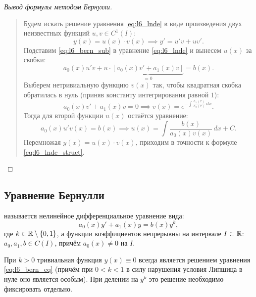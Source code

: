\begin{proof}[Вывод формулы методом Бернулли]~\\
    \begin{quote}
        Будем искать решение уравнения \eqref{eq:l6_lnde} в виде произведения
        двух неизвестных функций $u, v \in C^1(I)$:
        \begin{equation} \label{eq:l6_bern_sub}
            y(x) = u(x) \cdot v(x) \implies y' = u' v + u v'. \tag{8}
        \end{equation}
        Подставим \eqref{eq:l6_bern_sub} в уравнение \eqref{eq:l6_lnde} и
        вынесем $u(x)$ за скобки:
        \[
            a_0(x) u' v + u \cdot \underbrace{\left[a_0(x) v' +
            a_1(x) v\right]}_{= 0} = b(x).
        \]
        Выберем нетривиальную функцию $v(x)$ так, чтобы квадратная скобка
        обратилась в нуль (приняв константу интегрирования равной $1$):
        \[
            a_0(x) v' + a_1(x) v = 0 \implies
            v(x) = e^{-\int \frac{a_1(x)}{a_0(x)} \, dx}.
        \]
        Тогда для второй функции $u(x)$ остаётся уравнение:
        \[
            a_0(x) u' v(x) = b(x) \implies
            u(x) = \int \frac{b(x)}{a_0(x) v(x)} \, dx + C.
        \]
        Перемножая $y(x) = u(x) \cdot v(x)$, приходим в точности к формуле
        \eqref{eq:l6_lnde_struct}.
    \end{quote}
\end{proof}

\subsection{Уравнение Бернулли}

\begin{definition}
     называется нелинейное дифференциальное
    уравнение вида:
    \begin{equation} \label{eq:l6_bern_eq}
        a_0(x) y' + a_1(x) y = b(x) y^k, \tag{9}
    \end{equation}
    где $k \in \mathbb{R} \setminus \{0, 1\}$, а функции коэффициентов непрерывны на
    интервале $I \subset \mathbb{R}$: $a_0, a_1, b \in C(I)$, причём $a_0(x) \neq 0$
    на $I$.
\end{definition}

\begin{remark}
    При $k > 0$ тривиальная функция $y(x) \equiv 0$ всегда является решением
    уравнения \eqref{eq:l6_bern_eq} (причём при $0 < k < 1$ в силу нарушения
    условия Липшица в нуле оно является особым). При делении на $y^k$ это
    решение необходимо фиксировать отдельно.
\end{remark}


